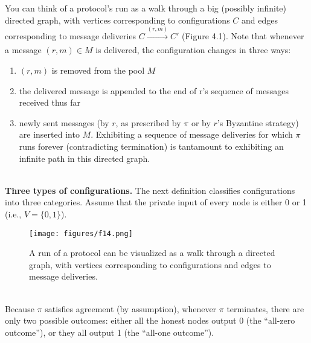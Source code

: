You can think of a protocol’s run as a walk through a big (possibly infinite) directed graph,
with vertices corresponding to configurations $C$ and edges corresponding to message deliveries $C \xrightarrow[]{(r,m)} C'$ (Figure 4.1). Note that whenever a message $(r, m) \in M$ is delivered, the configuration changes in three ways: 
\begin{enumerate}[label=(\roman*)]
    \item $(r, m)$ is removed from the pool $M$
    \item the delivered message is appended to the end of r’s sequence of messages received thus far
    \item newly sent messages (by $r$, as prescribed by $\pi$ or by $r$’s Byzantine strategy) are inserted
into $M$. Exhibiting a sequence of message deliveries for which $\pi$ runs forever (contradicting
termination) is tantamount to exhibiting an infinite path in this directed graph.
\end{enumerate}\\

\noindent
\textbf{Three types of configurations.} The next definition classifies configurations into three
categories. Assume that the private input of every node is either 0 or 1 (i.e., $V = \{0, 1\}$).\\

\begin{figure}[h]
    \centering
    \texttt{[image: figures/f14.png]}
    \caption{A run of a protocol can be visualized as a walk through a directed graph, with
    vertices corresponding to configurations and edges to message deliveries.}
    \label{fig:mesh1}
\end{figure}\\

Because $\pi$ satisfies agreement (by assumption), whenever $\pi$ terminates, there are only two
possible outcomes: either all the honest nodes output 0 (the “all-zero outcome”), or they all
output 1 (the “all-one outcome”).

